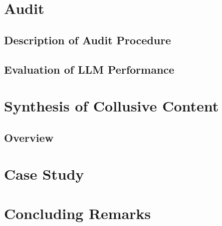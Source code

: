 \documentclass[12pt]{article}
\begin{document}
\section{\label{sec:audit}Audit}
\subsection{Description of Audit Procedure}

\subsection{Evaluation of LLM Performance}

\SectionFloatBarrier

\section{\label{sec:content}Synthesis of Collusive Content}
\subsection{Overview}

\SectionFloatBarrier


\section{\label{sec:case}Case Study}

\SectionFloatBarrier

\section{Concluding Remarks}

\FloatBarrier

\printbibliography
\end{document}
